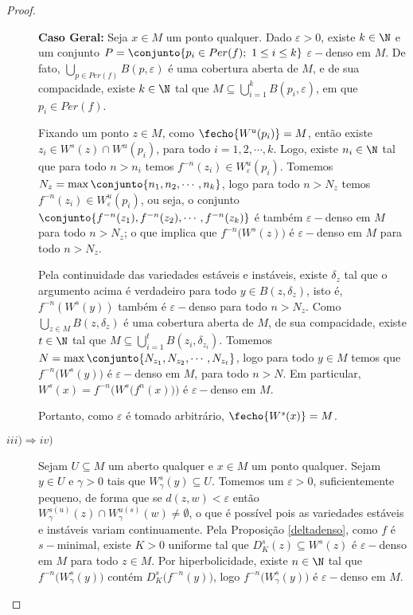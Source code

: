 \begin{proof}
\begin{description}
\textbf{Caso Geral:} Seja $x\in M$ um ponto qualquer. Dado $\varepsilon>0$, existe $k\in\N$ e um conjunto $P=\conjunto{p_i\in Per(f);\ 1\leq i\leq k}$ $\varepsilon-$denso em $M$. De fato, $\bigcup_{p\in Per(f)}B(p,\varepsilon)$ é uma cobertura aberta de $M$, e de sua compacidade, existe $k\in\N$ tal que $M\subseteq\bigcup_{i=1}^{k}B(p_i,\varepsilon)$, em que $p_i\in Per(f)$.

Fixando um ponto $z\in M$, como $\fecho{W^u(p_i)}=M$, então existe $z_i\in W^s(z)\cap W^u(p_i)$, para todo $i=1,2,\cdots,k$. Logo, existe $n_i\in\N$ tal que para todo $n>n_i$ temos $f^{-n}(z_i)\in W^u_{\varepsilon}(p_i)$. Tomemos $\displaystyle N_z=\max\conjunto{n_1,n_2,\cdots,n_k}$, logo para todo $n>N_z$ temos $f^{-n}(z_i)\in W^u_{\varepsilon}(p_i)$, ou seja, o conjunto $\conjunto{f^{-n}(z_1),f^{-n}(z_2),\cdots,f^{-n}(z_k)}$ é também $\varepsilon-$denso em $M$ para todo $n>N_z$; o que implica que $f^{-n}\big(W^s(z)\big)$ é $\varepsilon-$denso em $M$ para todo $n>N_z$.

Pela continuidade das variedades estáveis e instáveis, existe $\delta_z$ tal que o argumento acima é verdadeiro para todo $y\in B(z,\delta_z)$, isto é, $f^{-n}(W^s(y))$ também é $\varepsilon-$denso para todo $n>N_z$. Como $\bigcup_{z\in M}B(z,\delta_z)$ é uma cobertura aberta de $M$, de sua compacidade, existe $t\in\N$ tal que $M\subseteq\bigcup_{i=1}^{t}B(z_i,\delta_{z_i})$. Tomemos $\displaystyle N=\max\conjunto{N_{z_1},N_{z_2},\cdots,N_{z_t}}$, logo para todo $y\in M$ temos que $f^{-n}\big(W^s(y)\big)$ é $\varepsilon-$denso em $M$, para todo $n>N$. Em particular, $W^s(x)=f^{-n}\Big(W^s\big(f^n(x)\big)\Big)$ é $\varepsilon-$denso em $M$.

Portanto, como $\varepsilon$ é tomado arbitrário, $\fecho{W^s(x)}=M$. 

\item[$iii)\Rightarrow iv)$] Sejam $U\subseteq M$ um aberto qualquer e $x\in M$ um ponto qualquer. Sejam $y\in U$ e $\gamma>0$ tais que $W^{s}_{\gamma}(y)\subseteq U$. Tomemos um $\varepsilon>0$, suficientemente pequeno, de forma que se $d(z,w)<\varepsilon$ então $W^{s(u)}_{\gamma}(z)\cap W^{u(s)}_{\gamma}(w)\neq \emptyset$, o que é possível pois as variedades estáveis e instáveis variam continuamente. Pela Proposição \ref{deltadenso}, como $f$ é $s-$minimal, existe $K>0$ uniforme tal que $D^{s}_{K}(z)\subseteq W^s(z)$ é $\varepsilon-$denso em $M$ para todo $z\in M$. Por hiperbolicidade, existe $n\in\N$ tal que $f^{-n}\big(W^{s}_{\gamma}(y)\big)$ contém $D_{K}^{s}\big(f^{-n}(y)\big)$, logo $f^{-n}\big(W^{s}_{\gamma}(y)\big)$ é $\varepsilon-$denso em $M$.


\end{description}
\end{proof}
